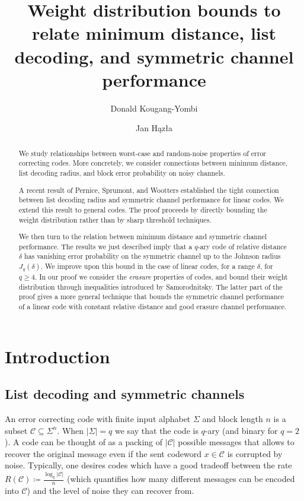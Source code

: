 \documentclass{article}
\title{Weight distribution bounds to
relate minimum distance, list decoding,
and symmetric channel performance}
\author{Donald Kougang-Yombi}
\author{Jan H{\k{a}}z{\l}a}
\affil{AIMS Rwanda\\ \texttt{\{donald.yombi, jan.hazla\}@aims.ac.rw}}
\date{}
\newcommand{\cC}{\mathcal{C}}
\theoremstyle{plain}
\theoremstyle{plain}
\theoremstyle{plain}
\theoremstyle{plain}
\theoremstyle{plain}
\theoremstyle{plain}
\theoremstyle{plain}
\theoremstyle{plain}
\theoremstyle{plain}
\theoremstyle{plain}
\theoremstyle{remark}
\theoremstyle{remark}
\theoremstyle{remark}
\theoremstyle{plain}
\begin{document}
\maketitle
\begin{abstract}
    We study relationships between worst-case and
    random-noise properties of error correcting codes.
    More concretely, we consider connections between minimum distance,
    list decoding radius, and block error probability on
    noisy channels.

    A recent result of Pernice, Sprumont, and Wootters established
    the tight connection between list decoding radius and symmetric
    channel performance for linear codes. We extend this result to general codes. The proof proceeds by directly bounding the weight  distribution rather than by sharp threshold techniques.

    We then turn to the relation between minimum distance
    and symmetric channel performance.
    The results we just described imply that a $q$-ary code of relative distance
    $\delta$ has vanishing error probability on the symmetric
    channel up to the Johnson radius $J_q(\delta)$.
    We improve upon this bound in the case of linear codes,
    for a range $\delta$, for $q\ge 4$.
    In our proof we consider the \emph{erasure} properties
    of codes, and bound their weight distribution through
    inequalities introduced by Samorodnitsky. The latter
    part of the proof gives a more general technique that
    bounds the symmetric channel performance 
    of a linear code with constant relative distance and good
    erasure channel performance.
 \end{abstract}
\section{Introduction}
\subsection{List decoding and symmetric channels}
\label{sec:intro-list-decoding}

An error correcting code with finite input alphabet $\Sigma$ and block length $n$ is a subset $\cC\subseteq\Sigma^n$. When
$|\Sigma|=q$ we say that the code is $q$-ary (and binary for $q=2$).
A code can be thought of as a packing of $|\cC|$ possible messages
that allows to recover the original message even if the
sent codeword $x\in \cC$ is corrupted by noise.
Typically, one desires codes which have a good tradeoff
between the rate $R(\cC)\coloneqq \frac{\log_q |\cC|}{n}$
(which quantifies how many different messages can
be encoded into $\cC$) and
the level of noise they can recover from.
\end{document}
